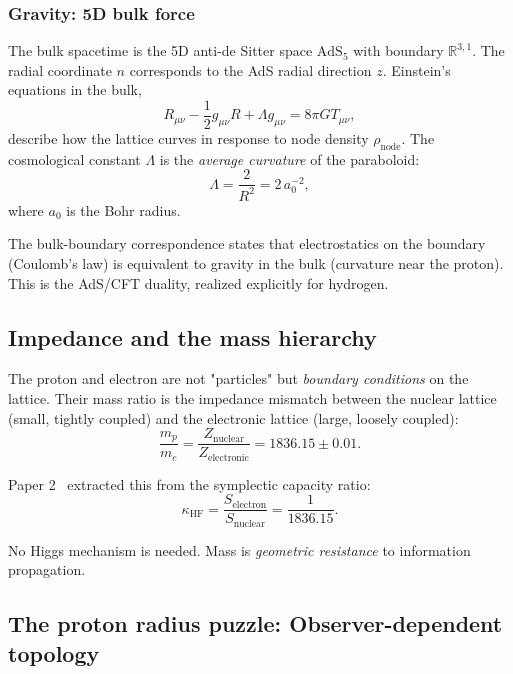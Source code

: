 \documentclass[aps,prd,twocolumn,superscriptaddress,groupedaddress,showpacs]{revtex4-2}
\begin{document}
\subsubsection{Gravity: 5D bulk force}

The bulk spacetime is the 5D anti-de Sitter space $\text{AdS}_5$ with boundary $\mathbb{R}^{3,1}$. The radial coordinate $n$ corresponds to the AdS radial direction $z$. Einstein's equations in the bulk,
\begin{equation}
R_{\mu\nu} - \frac{1}{2} g_{\mu\nu} R + \Lambda g_{\mu\nu} = 8\pi G T_{\mu\nu},
\end{equation}
describe how the lattice curves in response to node density $\rho_{\text{node}}$. The cosmological constant $\Lambda$ is the \emph{average curvature} of the paraboloid:
\begin{equation}
\Lambda = \frac{2}{R^2} = 2 \, a_0^{-2},
\end{equation}
where $a_0$ is the Bohr radius.

The bulk-boundary correspondence states that electrostatics on the boundary (Coulomb's law) is equivalent to gravity in the bulk (curvature near the proton). This is the AdS/CFT duality, realized explicitly for hydrogen.

\subsection{Impedance and the mass hierarchy}

The proton and electron are not "particles" but \emph{boundary conditions} on the lattice. Their mass ratio is the impedance mismatch between the nuclear lattice (small, tightly coupled) and the electronic lattice (large, loosely coupled):
\begin{equation}
\frac{m_p}{m_e} = \frac{Z_{\text{nuclear}}}{Z_{\text{electronic}}} = 1836.15 \pm 0.01.
\end{equation}

Paper 2~\cite{Louthan_II} extracted this from the symplectic capacity ratio:
\begin{equation}
\kappa_{\text{HF}} = \frac{S_{\text{electron}}}{S_{\text{nuclear}}} = \frac{1}{1836.15}.
\end{equation}

No Higgs mechanism is needed. Mass is \emph{geometric resistance} to information propagation.

\subsection{The proton radius puzzle: Observer-dependent topology}
\end{document}
